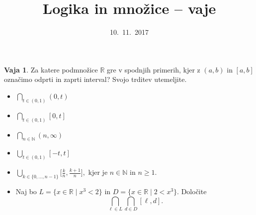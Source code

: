 \documentclass{article}
\newcommand{\NN}{\mathbb{N}}
\newcommand{\RR}{\mathbb{R}}
\theoremstyle{definition}
\newtheorem{vaja}{Vaja}
\begin{document}
\title{Logika in množice -- vaje}
\date{10.~11.~2017}
\maketitle

\begin{vaja}
  Za katere podmnožice $\RR$ gre v spodnjih primerih, kjer z $(a, b)$ in $[a, b]$ označimo odprti
  in zaprti interval? Svojo trditev utemeljite.
  \begin{itemize}
    \item
      $\displaystyle \bigcap_{t \in (0, 1)} (0, t)$
    \item
      $\displaystyle \bigcap_{t \in (0, 1)} [0, t]$
    \item
      $\displaystyle \bigcap_{n \in \NN} (n, \infty)$
    \item
      $\displaystyle \bigcup_{t \in (0, 1)} [-t, t]$
    \item
      $\displaystyle \bigcup_{k \in \{0, \ldots, n-1\}} \Big[\frac{k}{n}, \frac{k+1}{n}\Big],$
      kjer je $n \in \NN$ in $n \geq 1$.
    \item
      Naj bo $L = \{x \in \RR \mid x^3 < 2\}$ in $D = \{x \in \RR \mid 2 < x^3\}$.
      Določite $$\bigcap_{\ell \in L} \bigcap_{d \in D} [\ell, d].$$
  \end{itemize}
\end{vaja}

\newpage
\end{document}
